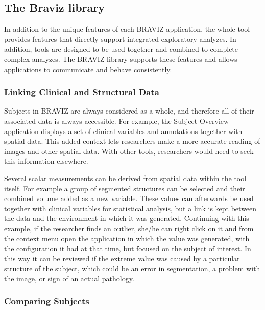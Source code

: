 \documentclass[twocolumn]{svjour3}
\begin{document}
\subsection{The Braviz library}

In addition to the unique features of each BRAVIZ application, the whole tool provides features that directly support integrated exploratory analyzes. In addition, tools are designed to be used together and combined to complete complex analyzes. The BRAVIZ library supports these features and allows applications to communicate and behave consistently. 

\subsubsection{Linking Clinical and Structural Data}

Subjects in BRAVIZ are always considered as a whole, and therefore all of their associated data is always accessible. For example, the Subject Overview application displays a set of clinical variables and annotations together with spatial-data. This added context lets researchers make a more accurate reading of images and other spatial data. With other tools, researchers would need to seek this information elsewhere. 

Several scalar measurements can be derived from spatial data within the tool itself. For example a group of segmented structures can be selected and their combined volume added as a new variable. These values can afterwards be used together with clinical variables for statistical analysis, but a link is kept between the data and the environment in which it was generated. Continuing with this example, if the researcher finds an outlier, she/he can right click on it and from the context menu open the application in which the value was generated, with the configuration it had at that time, but focused on the subject of interest. In this way it can be reviewed if the extreme value was caused by a particular structure of the subject, which could be an error in segmentation, a problem with the image, or sign of an actual pathology.

\subsubsection{Comparing Subjects}
\end{document}
